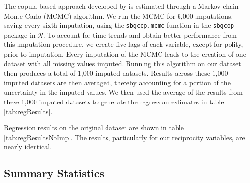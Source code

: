 The copula based approach developed by \citet{hoff:2007} is estimated through a Markov chain Monte Carlo (MCMC) algorithm. We run the MCMC for 6,000 imputations, saving every sixth imputation, using the \texttt{sbgcop.mcmc} function in the \texttt{sbgcop} package in $\mathcal{R}$. To account for time trends and obtain better performance from this imputation procedure, we create five lags of each variable, except for polity, prior to imputation. Every imputation of the MCMC leads to the creation of one dataset with all missing values imputed. Running this algorithm on our dataset then produces a total of 1,000 imputed datasets. Results across these 1,000 imputed datasets are then averaged, thereby accounting for a portion of the uncertainty in the imputed values. We then used the average of the results from these 1,000 imputed datasets to generate the regression estimates in table \ref{tab:regResults}. 

Regression results on the original dataset are shown in table \ref{tab:regResultsNoImp}. The results, particularly for our reciprocity variables, are nearly identical. 


\FloatBarrier

\subsection*{Summary Statistics}


\FloatBarrier


\FloatBarrier

\newpage